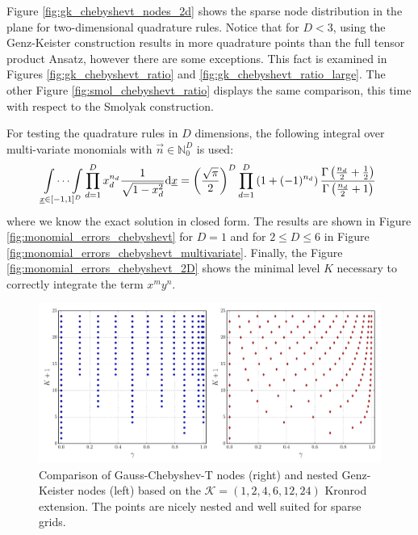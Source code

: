 \documentclass[a4paper,10pt]{article}
\begin{document}
Figure \ref{fig:gk_chebyshevt_nodes_2d} shows the sparse
node distribution in the plane for two-dimensional quadrature rules.
Notice that for $D < 3$, using the Genz-Keister construction results
in more quadrature points than the full tensor product Ansatz, however there
are some exceptions. This fact is examined in Figures \ref{fig:gk_chebyshevt_ratio}
and \ref{fig:gk_chebyshevt_ratio_large}. The other Figure
\ref{fig:smol_chebyshevt_ratio} displays the same comparison,
this time with respect to the Smolyak construction.

For testing the quadrature rules in $D$ dimensions, the following integral
over multi-variate monomials with $\vec{n} \in \mathbb{N}_0^D$ is used:
\begin{equation} \label{eq:chebyshevt_exact_solution}
  \idotsint \limits_{\underline{x} \in [-1,1]^D} \prod_{d=1}^D x_d^{n_d} \frac{1}{\sqrt{1-x_d^2}} \mathrm{d}\underline{x}
  =
  \left(\frac{\sqrt{\pi}}{2}\right)^D
  \prod_{d=1}^D \left(1 + (-1)^{n_d}\right)
  \frac{\Gamma\left(\frac{n_d}{2}+\frac{1}{2}\right)}
       {\Gamma\left(\frac{n_d}{2}+1\right)}
\end{equation}
where we know the exact solution in closed form. The results are shown in
Figure \ref{fig:monomial_errors_chebyshevt} for $D=1$ and for $2 \leq D \leq 6$
in Figure \ref{fig:monomial_errors_chebyshevt_multivariate}. Finally, the Figure
\ref{fig:monomial_errors_chebyshevt_2D} shows the minimal level $K$ necessary to
correctly integrate the term $x^m y^n$.

\begin{figure}[h]
  \centering
  \includegraphics[width=\linewidth]{./img/gk_chebyshevt_nodes_cmp.pdf}
  \caption{Comparison of Gauss-Chebyshev-T nodes (right) and nested Genz-Keister nodes (left)
  based on the $\mathcal{K} = (1, 2, 4, 6, 12, 24)$ Kronrod extension.
  The points are nicely nested and well suited for sparse grids.}
  \label{fig:gk_chebyshevt_nodes_cmp}
\end{figure}
\end{document}
